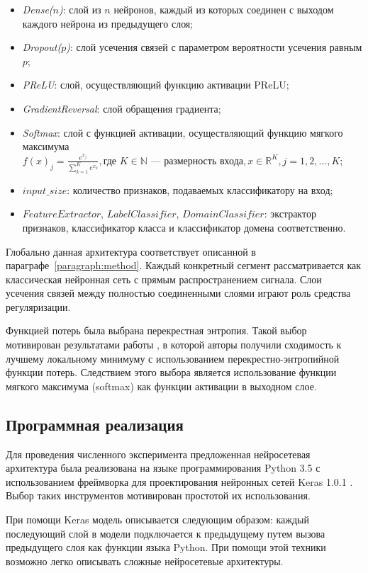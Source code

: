 \documentclass[14pt, a4paper]{extarticle}
\begin{document}
\begin{itemize}
	\item \textit{Dense($n$)}: слой из $n$ нейронов, каждый из которых соединен с выходом каждого нейрона из предыдущего слоя;
	\item \textit{Dropout($p$)}: слой усечения связей с параметром вероятности усечения равным $p$;
	\item \textit{PReLU}: слой, осуществляющий функцию активации PReLU;
	\item \textit{GradientReversal}: слой обращения градиента;
	\item \textit{Softmax}: слой с функцией активации, осуществляющий функцию мягкого максимума \\ $f(x)_j = \frac{e^{x_j}}{\sum_{k=1}^K e^{x_k}}, \text{где~} K \in \mathbb{N} \text{ — размерность входа}, x \in \mathbb{R}^K, j=1,2,..., K$;
	\item $input\_size$: количество признаков, подаваемых классификатору на вход;
	\item $Feature Extractor$, $Label Classifier$, $Domain Classifier$: экстрактор признаков, классификатор класса и классификатор домена соответственно.
\end{itemize}

Глобально данная архитектура соответствует описанной в параграфе~\ref{paragraph:method}. Каждый конкретный сегмент рассматривается как классическая нейронная сеть с прямым распространением сигнала. Слои усечения связей между полностью соединенными слоями играют роль средства регуляризации.

Функцией потерь была выбрана перекрестная энтропия. Такой выбор мотивирован результатами работы \cite{crossentropy_vs_mse}, в которой авторы получили сходимость к лучшему локальному минимуму с использованием перекрестно-энтропийной функции потерь. Следствием этого выбора является использование функции мягкого максимума (softmax) как функции активации в выходном слое.

\subsection*{Программная реализация}

Для проведения численного эксперимента предложенная нейросетевая архитектура была реализована на языке программирования Python 3.5 с использованием фреймворка для проектирования нейронных сетей Keras 1.0.1 \cite{keras}. Выбор таких инструментов мотивирован простотой их использования.

При помощи Keras модель описывается следующим образом: каждый последующий слой в модели подключается к предыдущему путем вызова предыдущего слоя как функции языка Python. При помощи этой техники возможно легко описывать сложные нейросетевые архитектуры.
\end{document}
